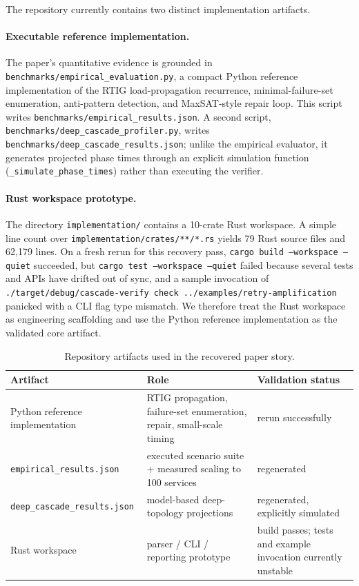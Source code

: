 \documentclass[10pt,twocolumn]{article}
\begin{document}
The repository currently contains two distinct implementation artifacts.

\paragraph{Executable reference implementation.}
The paper's quantitative evidence is grounded in
\texttt{benchmarks/empirical\_evaluation.py}, a compact Python reference
implementation of the RTIG load-propagation recurrence, minimal-failure-set
enumeration, anti-pattern detection, and MaxSAT-style repair loop.  This script
writes \texttt{benchmarks/empirical\_results.json}.  A second script,
\texttt{benchmarks/deep\_cascade\_profiler.py}, writes
\texttt{benchmarks/deep\_cascade\_results.json}; unlike the empirical evaluator,
it generates projected phase times through an explicit simulation function
(\texttt{\_simulate\_phase\_times}) rather than executing the verifier.

\paragraph{Rust workspace prototype.}
The directory \texttt{implementation/} contains a 10-crate Rust workspace.
A simple line count over \texttt{implementation/crates/**/*.rs} yields 79 Rust
source files and 62{,}179 lines.  On a fresh rerun for this recovery pass,
\texttt{cargo build --workspace --quiet} succeeded, but
\texttt{cargo test --workspace --quiet} failed because several tests and APIs
have drifted out of sync, and a sample invocation of
\texttt{./target/debug/cascade-verify check ../examples/retry-amplification}
panicked with a CLI flag type mismatch.  We therefore treat the Rust workspace
as engineering scaffolding and use the Python reference implementation as the
validated core artifact.

\begin{table}[t]
\centering
\caption{Repository artifacts used in the recovered paper story.}
\label{tab:artifacts}
\small
\begin{tabular}{@{}p{2.3cm}p{2.6cm}p{2.6cm}@{}}
\toprule
\textbf{Artifact} & \textbf{Role} & \textbf{Validation status} \\
\midrule
Python reference implementation & RTIG propagation, failure-set enumeration, repair, small-scale timing & rerun successfully \\
\texttt{empirical\_results.json} & executed scenario suite + measured scaling to 100 services & regenerated \\
\texttt{deep\_cascade\_results.json} & model-based deep-topology projections & regenerated, explicitly simulated \\
Rust workspace & parser / CLI / reporting prototype & build passes; tests and example invocation currently unstable \\
\bottomrule
\end{tabular}
\end{table}
\end{document}
